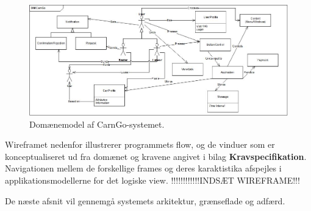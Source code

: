 \documentclass[Rapport/Rapport_main.tex]{subfiles}
\begin{document}
\begin{figure}[H]
    \centering
    \includegraphics[width=1\textwidth]{Arkitektur/Softwarearkitektur/UserStoryArchitecture/graphics/DomainModel.jpg}
    \caption{Domænemodel af CarnGo-systemet.}
    \label{fig:domain}
\end{figure}
Wireframet nedenfor illustrerer programmets flow, og de vinduer som er konceptualiseret ud fra domænet og kravene angivet i bilag \textbf{Kravspecifikation}. Navigationen mellem de forskellige frames og deres karaktistika afspejles i applikationsmodellerne for det logiske view. 
!!!!!!!!!!!!INDSÆT WIREFRAME!!!

De næste afsnit vil gennemgå systemets arkitektur, grænseflade og adfærd. \newpage

 \newpage
\newpage 
\newpage 
\newpage 
\newpage 
 \newpage
\end{document}

